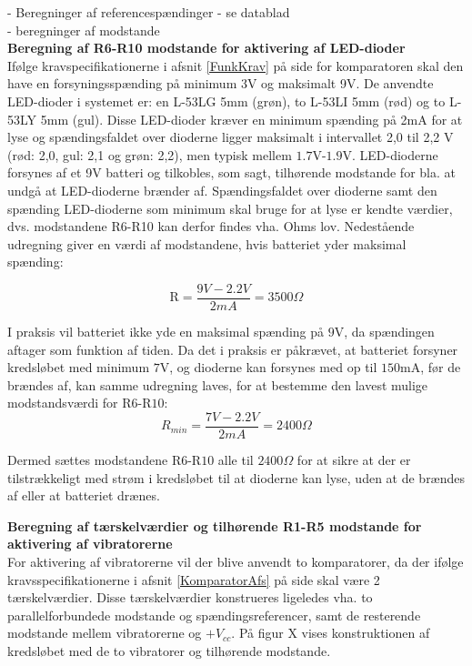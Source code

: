 

- Beregninger af referencespændinger - se datablad \\
- beregninger af modstande \\


\noindent\textbf{Beregning af R6-R10 modstande for aktivering af LED-dioder} \\
Ifølge kravspecifikationerne i afsnit \ref{FunkKrav}  på side \pageref{FunkKrav} for komparatoren skal den have en forsyningsspænding på minimum 3V og maksimalt 9V. De anvendte LED-dioder i systemet er: en L-53LG 5mm (grøn), to L-53LI 5mm (rød) og to L-53LY 5mm (gul). Disse LED-dioder kræver en minimum spænding på 2mA for at lyse og spændingsfaldet over dioderne ligger maksimalt i intervallet 2,0 til 2,2 V (rød: 2,0, gul: 2,1 og grøn: 2,2), men typisk mellem $1.7$V-$1.9$V. LED-dioderne forsynes af et 9V batteri og tilkobles, som sagt, tilhørende modstande for bla. at undgå at LED-dioderne brænder af. Spændingsfaldet over dioderne samt den spænding LED-dioderne som minimum skal bruge for at lyse er kendte værdier, dvs. modstandene R6-R10 kan derfor findes vha. Ohms lov. Nedestående udregning giver en værdi af modstandene, hvis batteriet yder maksimal spænding:

\begin{equation}
\text{R} = \dfrac{9V - 2.2V}{2mA} = 3500\Omega
\end{equation}

\noindent I praksis vil batteriet ikke yde en maksimal spænding på $9$V, da spændingen aftager som funktion af tiden. Da det i praksis er påkrævet, at batteriet forsyner kredsløbet med minimum $7$V, og dioderne kan forsynes med op til $150$mA, før de brændes af, kan samme udregning laves, for at bestemme den lavest mulige modstandsværdi for R$6$-R$10$:
\begin{equation}
R_{min} = \dfrac{7V-2.2V}{2mA} = 2400\Omega
\end{equation}

\noindent Dermed sættes modstandene R$6$-R$10$ alle til $2400\Omega$ for at sikre at der er tilstrækkeligt med strøm i kredsløbet til at dioderne kan lyse, uden at de brændes af eller at batteriet drænes. 

\noindent\textbf{Beregning af tærskelværdier og tilhørende R1-R5 modstande for aktivering af  vibratorerne} \\
For aktivering af vibratorerne vil der blive anvendt to komparatorer, da der ifølge kravsspecifikationerne i afsnit \ref{KomparatorAfs} på side \pageref{KomparatorAfs} skal være 2 tærskelværdier. Disse tærskelværdier konstrueres ligeledes vha. to parallelforbundede modstande og spændingsreferencer, samt de resterende modstande mellem vibratorerne og $+V_{cc}$. På figur X vises konstruktionen af kredsløbet med de to vibratorer og tilhørende modstande. \\


